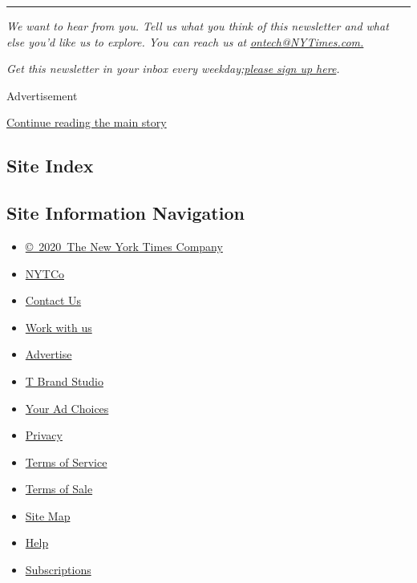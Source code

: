 \begin{center}\rule{0.5\linewidth}{\linethickness}\end{center}

\emph{We want to hear from you. Tell us what you think of this
newsletter and what else you'd like us to explore. You can reach us at}
\href{mailto:ontech@NYTimes.com?subject=On\%20Tech\%20Feedback}{\emph{ontech@NYTimes.com.}}

\emph{Get this newsletter in your inbox every
weekday;}\href{https://www.nytimes3xbfgragh.onion/newsletters/signup/OT}{\emph{please
sign up here}}\emph{.}

Advertisement

\protect\hyperlink{after-bottom}{Continue reading the main story}

\hypertarget{site-index}{%
\subsection{Site Index}\label{site-index}}

\hypertarget{site-information-navigation}{%
\subsection{Site Information
Navigation}\label{site-information-navigation}}

\begin{itemize}
\tightlist
\item
  \href{https://help.nytimes3xbfgragh.onion/hc/en-us/articles/115014792127-Copyright-notice}{©~2020~The
  New York Times Company}
\end{itemize}

\begin{itemize}
\tightlist
\item
  \href{https://www.nytco.com/}{NYTCo}
\item
  \href{https://help.nytimes3xbfgragh.onion/hc/en-us/articles/115015385887-Contact-Us}{Contact
  Us}
\item
  \href{https://www.nytco.com/careers/}{Work with us}
\item
  \href{https://nytmediakit.com/}{Advertise}
\item
  \href{http://www.tbrandstudio.com/}{T Brand Studio}
\item
  \href{https://www.nytimes3xbfgragh.onion/privacy/cookie-policy\#how-do-i-manage-trackers}{Your
  Ad Choices}
\item
  \href{https://www.nytimes3xbfgragh.onion/privacy}{Privacy}
\item
  \href{https://help.nytimes3xbfgragh.onion/hc/en-us/articles/115014893428-Terms-of-service}{Terms
  of Service}
\item
  \href{https://help.nytimes3xbfgragh.onion/hc/en-us/articles/115014893968-Terms-of-sale}{Terms
  of Sale}
\item
  \href{https://spiderbites.nytimes3xbfgragh.onion}{Site Map}
\item
  \href{https://help.nytimes3xbfgragh.onion/hc/en-us}{Help}
\item
  \href{https://www.nytimes3xbfgragh.onion/subscription?campaignId=37WXW}{Subscriptions}
\end{itemize}
